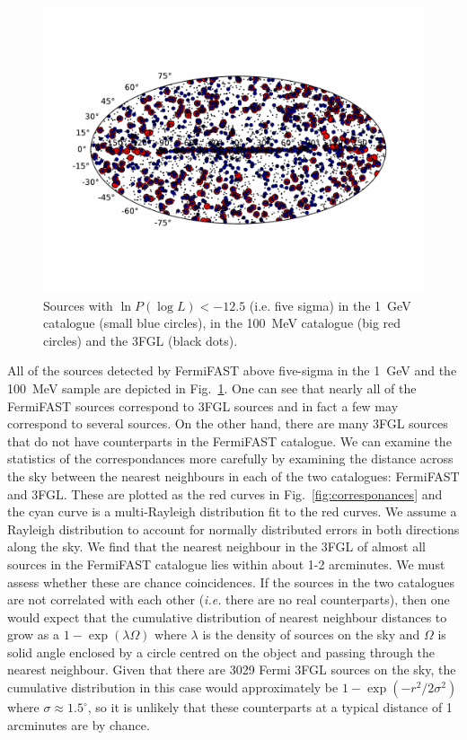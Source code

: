 \documentclass[useAMS,usenatbib]{mn2e}
\begin{document}
\begin{figure}
  \includegraphics[width=\textwidth,clip,trim=0.6in 1in 0.8in
    1in]{source_plot}
  \caption{Sources with $\ln P(\log L)<-12.5$ (i.e. five sigma) in the
    1~GeV catalogue (small blue circles), in the 100~MeV catalogue
    (big red circles) and the 3FGL (black dots).}
  \label{fig:sources}
\end{figure}

All of the sources detected by FermiFAST above five-sigma in the 1~GeV
and the 100~MeV sample are depicted in Fig.~\ref{fig:sources}.  One
can see that nearly all of the FermiFAST sources correspond to 3FGL
sources and in fact a few may correspond to several sources.  On the
other hand, there are many 3FGL sources that do not have counterparts
in the FermiFAST catalogue.  We can examine the statistics of the
correspondances more carefully by examining the distance across the
sky between the nearest neighbours in each of the two catalogues:
FermiFAST and 3FGL.  These are plotted as the red curves in
Fig.~\ref{fig:corresponances} and the cyan curve is a multi-Rayleigh
distribution fit to the red curves.  We assume a Rayleigh distribution
to account for normally distributed errors in both directions along
the sky.  We find that the nearest neighbour in the 3FGL of almost all sources
in the FermiFAST catalogue lies within about 1-2
arcminutes.  We must assess whether these are chance coincidences.  If
the sources in the two catalogues are not correlated with each other
({\em i.e.} there are no real counterparts), then one would expect
that the cumulative distribution of nearest neighbour distances to
grow as a $1-\exp(\lambda \Omega)$ where $\lambda$ is the density of
sources on the sky and $\Omega$ is solid angle enclosed by a circle
centred on the object and passing through the nearest neighbour.
Given that there are 3029 Fermi 3FGL sources on the sky, the
cumulative distribution in this case would approximately be
$1-\exp(-r^2/2\sigma^2)$ where $\sigma\approx 1.5^\circ$, so it is
unlikely that these counterparts at a typical distance of 1 arcminutes
are by chance.
\end{document}
